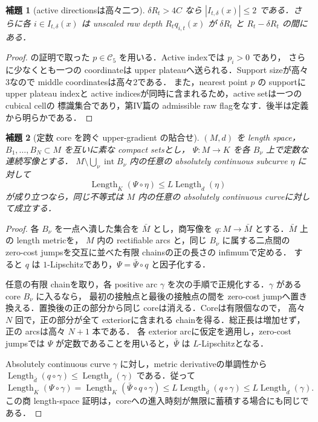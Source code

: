 \documentclass[a4paper,11pt]{ltjsarticle}
\numberwithin{equation}{section}
\theoremstyle{plain}
\newtheorem{lemma}[lemma]{補題}
\theoremstyle{definition}
\theoremstyle{remark}
\newcommand{\cC}{\mathcal C}
\newcommand{\Length}{\operatorname{Length}}
\begin{document}
\begin{lemma}[active directionsは高々二つ]\label{lem:raw-active-finite-type}
$\delta R_t>4C$ なら $|I_{t,\delta}(x)|\le2$ である．さらに各 $i\in I_{t,\delta}(x)$ は unscaled raw depth
$R_tq_{i,t}(x)$ が $\delta R_t$ と $R_t-\delta R_t$ の間にある．
\end{lemma}

\begin{proof}
 の証明で取った $p\in\cC_5$ を用いる．Active indexでは $p_i>0$ であり，
さらに少なくとも一つの coordinateは upper plateauへ送られる．Support sizeが高々3なので middle coordinatesは高々2である．
また，nearest point $p$ の supportに upper plateau indexと active indicesが同時に含まれるため，active setは一つの cubical cellの
標識集合であり，第IV篇の admissible raw flagをなす．後半は定義から明らかである．
\end{proof}



\begin{lemma}[定数 core を跨ぐ upper-gradient の貼合せ]\label{lem:constant-core-upper-gradient}
$(M,d)$ を length space，$B_1,\ldots,B_N\subset M$ を互いに素な compact setsとし，
$\Psi:M\to K$ を各 $B_\nu$ 上で定数な連続写像とする．
$M\setminus\bigcup_\nu\operatorname{int}B_\nu$ 内の任意の absolutely continuous subcurve $\eta$ に対して
\[
 \Length_K(\Psi\circ\eta)\le L\Length_d(\eta)
\]
が成り立つなら，同じ不等式は $M$ 内の任意の absolutely continuous curveに対して成立する．
\end{lemma}

\begin{proof}
各 $B_\nu$ を一点へ潰した集合を $\bar M$ とし，商写像を $q:M\to\bar M$ とする．$\bar M$ 上の length metricを，
$M$ 内の rectifiable arcs と，同じ $B_\nu$ に属する二点間の zero-cost jumpsを交互に並べた有限 chainsの正の長さの infimumで定める．
すると $q$ は $1$-Lipschitzであり，$\Psi=\bar\Psi\circ q$ と因子化する．

任意の有限 chainを取り，各 positive arc $\gamma$ を次の手順で正規化する．$\gamma$ がある core $B_\nu$ に入るなら，
最初の接触点と最後の接触点の間を zero-cost jumpへ置き換える．置換後の正の部分から同じ coreは消える．Coreは有限個なので，
高々 $N$ 回で，正の部分が全て exteriorに含まれる chainを得る．総正長は増加せず，正の arcsは高々 $N+1$ 本である．
各 exterior arcに仮定を適用し，zero-cost jumpsでは $\Psi$ が定数であることを用いると，$\bar\Psi$ は $L$-Lipschitzとなる．

Absolutely continuous curve $\gamma$ に対し，metric derivativeの単調性から
$\Length_{\bar d}(q\circ\gamma)\le\Length_d(\gamma)$ である．従って
\[
 \Length_K(\Psi\circ\gamma)
 =\Length_K(\bar\Psi\circ q\circ\gamma)
 \le L\Length_{\bar d}(q\circ\gamma)
 \le L\Length_d(\gamma).
\]
この商 length-space 証明は，coreへの進入時刻が無限に蓄積する場合にも同じである．
\end{proof}
\end{document}
